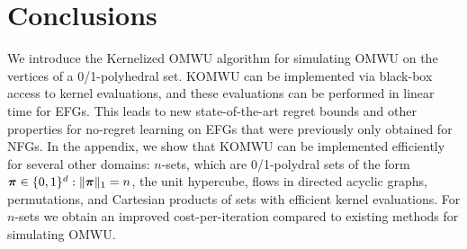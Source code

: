 \section{Conclusions}

We introduce the Kernelized OMWU algorithm for simulating OMWU on the vertices of a 0/1-polyhedral set.
KOMWU can be implemented via black-box access to kernel evaluations, and these evaluations can be performed in linear time for EFGs.
This leads to new state-of-the-art regret bounds and other properties for no-regret learning on EFGs that were previously only obtained for NFGs.
In the appendix, we show that KOMWU can be implemented efficiently for several other domains:
$n$-sets, which are  0/1-polydral sets of the form $\bm{\pi} \in \{0,1\}^d: \|\bm{\pi}\|_1 = n$,
the unit hypercube, flows in directed acyclic graphs, permutations, and Cartesian products of sets with efficient kernel evaluations.
For $n$-sets we obtain an improved cost-per-iteration compared to existing methods for simulating OMWU.



